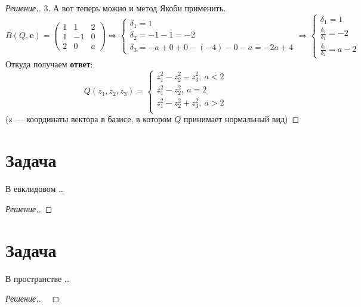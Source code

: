 \documentclass[a4paper]{article}
\theoremstyle{remark}
\newcommand{\eq}[1]{\begin{cases} #1 \end{cases}}
\begin{document}
\begin{proof}[Решение.]
            3. А вот теперь можно и метод Якоби применить. 
            \[
                B(Q,\bm{e}) = 
                \begin{pmatrix}
                    1 & 1 & 2\\
                    1 & -1 & 0 \\
                    2 & 0 & a
                \end{pmatrix} 
                \Rightarrow 
                \eq{
                    \delta_1 = 1\\
                    \delta_2 = -1 - 1 = -2 \\
                    \delta_3 = -a + 0  + 0 - (-4) - 0 - a = -2a + 4
                } 
                \Rightarrow 
                \eq{
                    \delta_1 = 1\\
                    \frac{\delta_2}{\delta_1} = -2 \\
                    \frac{\delta_3}{\delta_2} = a - 2
                }
            \]
            Откуда получаем \textbf{ответ}: 
            \[
                Q(z_1, z_2, z_3) = \eq{
                    z_1^2 - z_2^2 - z_3^2, \ a < 2\\
                    z_1^2 - z_2^2, \ a = 2\\
                    z_1^2 - z_2^2 + z_3^2, \ a > 2\\}
            \] 
            (z --- координаты вектора в базисе, в котором $Q$ 
            принимает нормальный вид)

        \end{proof}
      
    \section*{Задача }
        В евклидовом \dots
        \begin{proof}[Решение.]
            
        \end{proof}
    
    \section*{Задача }
        В пространстве \dots
        \begin{proof}[Решение.] \ 

        \end{proof}
\end{document}
